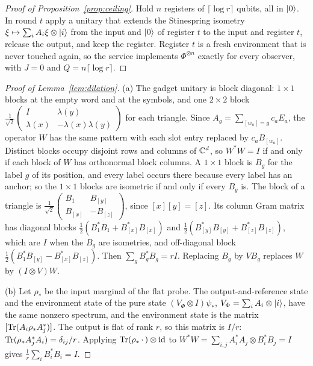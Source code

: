 \begin{proof}[Proof of Proposition~\ref{prop:ceiling}]
Hold $n$ registers of $\lceil\log r\rceil$ qubits, all in $\lvert 0\rangle$. In round $t$ apply a unitary that extends the Stinespring isometry
$\xi\mapsto\sum_iA_i\xi\otimes\lvert i\rangle$ from the input and $\lvert 0\rangle$ of register $t$ to the input and register $t$, release the output, and keep the register.
Register $t$ is a fresh environment that is never touched again, so the service implements $\Phi^{\otimes n}$ exactly for every observer, with $J=0$ and
$Q=n\lceil\log r\rceil$.
\end{proof}

\begin{proof}[Proof of Lemma~\ref{lem:dilation}]
(a) The gadget unitary is block diagonal: $1\times1$ blocks at the empty word and at the symbols, and one $2\times2$ block
$\frac1{\sqrt2}\left(\begin{smallmatrix}I&\lambda(y)\\\lambda(x)&-\lambda(x)\lambda(y)\end{smallmatrix}\right)$ for each triangle. Since
$A_g=\sum_{[w_a]=g}c_aE_a$, the operator $W$ has the same pattern with each slot entry replaced by $c_aB_{[w_a]}$. Distinct blocks occupy disjoint rows and
columns of $\mathbb C^d$, so $W^*W=I$ if and only if each block of $W$ has orthonormal block columns. A $1\times1$ block is $B_g$ for the label $g$ of its
position, and every label occurs there because every label has an anchor; so the $1\times1$ blocks are isometric if and only if every $B_g$ is. The block
of a triangle is $\frac1{\sqrt2}\left(\begin{smallmatrix}B_1&B_{[y]}\\B_{[x]}&-B_{[z]}\end{smallmatrix}\right)$, since $[x][y]=[z]$. Its column Gram matrix has
diagonal blocks $\frac12(B_1^*B_1+B_{[x]}^*B_{[x]})$ and $\frac12(B_{[y]}^*B_{[y]}+B_{[z]}^*B_{[z]})$, which are $I$ when the $B_g$ are isometries, and
off-diagonal block $\frac12(B_1^*B_{[y]}-B_{[x]}^*B_{[z]})$. Then $\sum_gB_g^*B_g=rI$. Replacing $B_g$ by $VB_g$ replaces $W$ by $(I\otimes V)W$.

(b) Let $\rho_*$ be the input marginal of the flat probe. The output-and-reference state and the environment state of the pure state
$(V_\Phi\otimes I)\psi_*$, $V_\Phi=\sum_iA_i\otimes\lvert i\rangle$, have the same nonzero spectrum, and the environment state is the matrix $[\operatorname{Tr}(A_i\rho_*A_j^*)]$. The
output is flat of rank $r$, so this matrix is $I/r$: $\operatorname{Tr}(\rho_*A_j^*A_i)=\delta_{ij}/r$. Applying $\operatorname{Tr}(\rho_*\,\cdot\,)\otimes\mathrm{id}$ to
$W^*W=\sum_{i,j}A_i^*A_j\otimes B_i^*B_j=I$ gives $\frac1r\sum_iB_i^*B_i=I$.


\end{proof}
